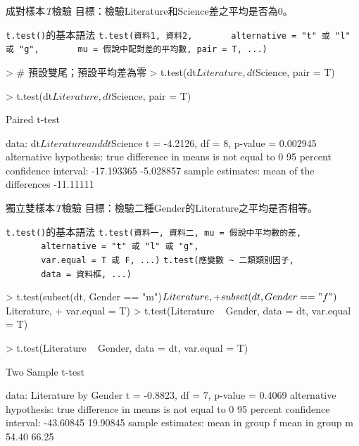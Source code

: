 \documentclass[14pt, aspectratio=43]{beamer}
\begin{document}
\begin{frame}{成對樣本\emph{T}檢驗}
目標：檢驗Literature和Science差之平均是否為0。
\begin{block}{\texttt{t.test()}的基本語法}
\verb+t.test(資料1, 資料2,+
\verb+       alternative = "t" 或 "l" 或 "g",+
\verb+       mu = 假說中配對差的平均數, pair = T, ...)+
\end{block}
\begin{RC}
> # 預設雙尾；預設平均差為零
> t.test(dt$Literature, dt$Science, pair = T)
\end{RC}

\framebreak

\begin{RC}
> t.test(dt$Literature, dt$Science, pair = T)
\end{RC}
\begin{R}
        Paired t-test

data:  dt$Literature and dt$Science
t = -4.2126, df = 8, p-value = 0.002945
alternative hypothesis: true difference in means is not equal to 0
95 percent confidence interval:
 -17.193365  -5.028857
sample estimates:
mean of the differences 
              -11.11111 
\end{R}
\end{frame}


\begin{frame}{獨立雙樣本\emph{T}檢驗}
目標：檢驗二種Gender的Literature之平均是否相等。
\begin{block}{\texttt{t.test()}的基本語法}
\verb+t.test(資料一, 資料二, mu = 假說中平均數的差,+\\
\verb+       alternative = "t" 或 "l" 或 "g",+\\
\verb+       var.equal = T 或 F, ...)+
\verb+t.test(應變數 ~ 二類類別因子,+\\
\verb+       data = 資料框, ...)+
\end{block}
\begin{RC}
> t.test(subset(dt, Gender == "m")$Literature,
+        subset(dt, Gender == "f")$Literature,
+        var.equal = T)
> t.test(Literature ~ Gender, data = dt, var.equal = T)
\end{RC}

\framebreak

\begin{RC}
> t.test(Literature ~ Gender, data = dt, var.equal = T)
\end{RC}
\begin{R}
        Two Sample t-test

data:  Literature by Gender
t = -0.8823, df = 7, p-value = 0.4069
alternative hypothesis: true difference in means is not equal to 0
95 percent confidence interval:
 -43.60845  19.90845
sample estimates:
mean in group f mean in group m 
          54.40           66.25 
\end{R}
\end{frame}
\end{document}
